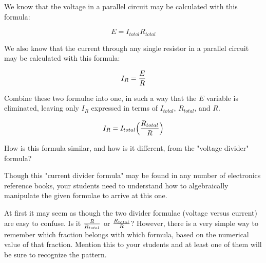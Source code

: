 

We know that the voltage in a parallel circuit may be calculated with this formula:

$$E = {I_{total} R_{total}}$$

We also know that the current through any single resistor in a parallel circuit may be calculated with this formula:

$$I_R = {E \over R}$$

Combine these two formulae into one, in such a way that the $E$ variable is eliminated, leaving only $I_R$ expressed in terms of $I_{total}$, $R_{total}$, and $R$.







$$I_R = I_{total} \Bigl({R_{total} \over R}\Bigr)$$

How is this formula similar, and how is it different, from the "voltage divider" formula?







Though this "current divider formula" may be found in any number of electronics reference books, your students need to understand how to algebraically manipulate the given formulae to arrive at this one.

At first it may seem as though the two divider formulae (voltage versus current) are easy to confuse.  Is it ${R \over R_{total}}$ or ${R_{total} \over R}$?  However, there is a very simple way to remember which fraction belongs with which formula, based on the numerical value of that fraction.  Mention this to your students and at least one of them will be sure to recognize the pattern.




